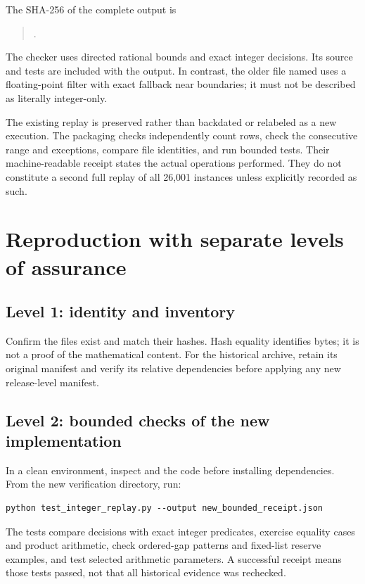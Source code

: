 \documentclass[11pt,letterpaper]{article}
\theoremstyle{remark}\newtheorem{remark}[theorem]{Remark}
\begin{document}
The SHA-256 of the complete output is
\begin{quote}\small{}.\end{quote}
The checker uses directed rational bounds and exact integer decisions. Its source and tests are included with the output. In contrast, the older file named  uses a floating-point filter with exact fallback near boundaries; it must not be described as literally integer-only.

The existing replay is preserved rather than backdated or relabeled as a new execution. The packaging checks independently count rows, check the consecutive range and exceptions, compare file identities, and run bounded tests. Their machine-readable receipt states the actual operations performed. They do not constitute a second full replay of all 26,001 instances unless explicitly recorded as such.

\section{Reproduction with separate levels of assurance}
\subsection*{Level 1: identity and inventory}
Confirm the files exist and match their hashes. Hash equality identifies bytes; it is not a proof of the mathematical content. For the historical archive, retain its original manifest and verify its relative dependencies before applying any new release-level manifest.

\subsection*{Level 2: bounded checks of the new implementation}
In a clean environment, inspect  and the code before installing dependencies. From the new verification directory, run:
\begin{verbatim}
python test_integer_replay.py --output new_bounded_receipt.json
\end{verbatim}
The tests compare decisions with exact integer predicates, exercise equality cases and product arithmetic, check ordered-gap patterns and fixed-list reserve examples, and test selected arithmetic parameters. A successful receipt means those tests passed, not that all historical evidence was rechecked.
\end{document}
